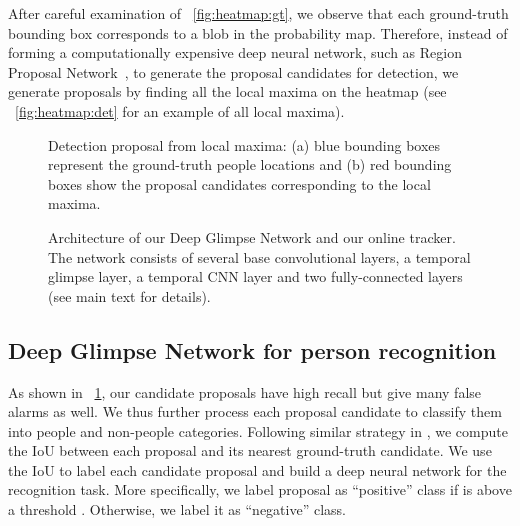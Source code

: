 \documentclass{article}
\begin{document}
After careful examination of \figurename{~\ref{fig:heatmap:gt}}, we observe that each ground-truth bounding box corresponds to a blob in the probability map.
Therefore, instead of forming a computationally expensive deep neural network, such as Region Proposal Network~\cite{ren2015faster}, to generate the proposal candidates for detection, we generate proposals by finding all the local maxima on the heatmap (see \figurename{~\ref{fig:heatmap:det}} for an example of all local maxima).
\begin{figure}
	\begin{center}
	\end{center}
   	\caption{Detection proposal from local maxima: (a) blue bounding boxes represent the ground-truth people locations and (b) red bounding boxes show the proposal candidates corresponding to the local maxima.}
	\label{fig:heatmap}
\end{figure}

\begin{figure*}
	\begin{center}
		\hspace{1cm}\end{center}
	\caption{Architecture of our Deep Glimpse Network and our online tracker. The network consists of several base convolutional layers, a temporal glimpse layer, a temporal CNN layer and two fully-connected layers (see main text for details). }
	
\end{figure*}
\subsection{Deep Glimpse Network for person recognition}
As shown in \figurename{~\ref{fig:heatmap}}, our candidate proposals have high recall but
give many false alarms as well.
We thus further process each proposal candidate to classify them into people and non-people categories. 
Following similar strategy in \cite{Girshick_2014_CVPR},
we compute the IoU  between each proposal  and its nearest ground-truth candidate.
We use the IoU to label each candidate proposal and build a deep neural network for the recognition task. More specifically, we label proposal  as ``positive'' class if  is above a threshold . Otherwise, we label it as ``negative'' class.
\end{document}
